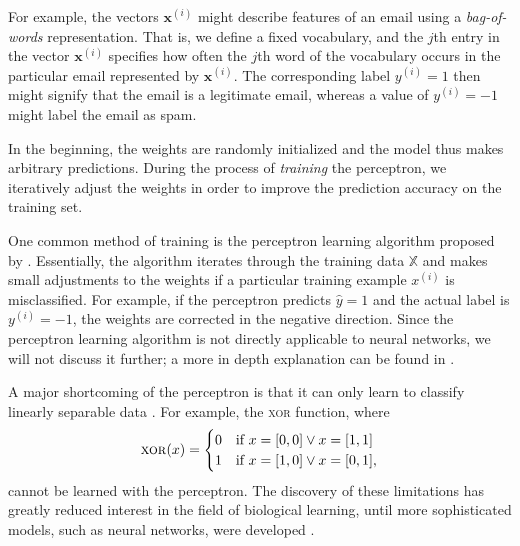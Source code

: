 For example, the vectors $\bm{x}^{(i)}$ might describe features of an email using a \emph{bag-of-words} representation. That is, we define a fixed vocabulary, and the $j$th entry in the vector $\bm{x}^{(i)}$ specifies how often the $j$th word of the vocabulary occurs in the particular email represented by $\bm{x}^{(i)}$. The corresponding label $y^{(i)} = 1$ then might signify that the email is a legitimate email, whereas a value of $y^{(i)} = -1$ might label the email as spam.

In the beginning, the weights are randomly initialized and the model thus makes arbitrary predictions. During the process of \emph{training} the perceptron, we iteratively adjust the weights in order to improve the prediction accuracy on the training set.

One common method of training is the perceptron learning algorithm proposed by \cite{Rosenblatt1958386}. Essentially, the algorithm iterates through the training data $\mathbb{X}$ and makes small adjustments to the weights if a particular training example $x^{(i)}$ is misclassified. For example, if the perceptron predicts $\hat{y} = 1$ and the actual label is $y^{(i)} = -1$, the weights are corrected in the negative direction. Since the perceptron learning algorithm is not directly applicable to neural networks, we will not discuss it further; a more in depth explanation can be found in \cite[Ch.\,8,\,pp.\,265-267]{DBLP:books/lib/Murphy12}.

A major shortcoming of the perceptron is that it can only learn to classify linearly separable data \cite{DBLP:books/daglib/0066902}. For example, the \textsc{xor} function, where 
\begin{equation}
\text{\textsc{xor}}(x) = 
\begin{cases} 0 & \text{if }x = [0,0] \lor x = [1,1] 
			\\1 & \text{if }x = [1,0] \lor x = [0,1],
\end{cases}
\end{equation}
cannot be learned with the perceptron. The discovery of these limitations has greatly reduced interest in the field of biological learning, until more sophisticated models, such as neural networks, were developed \cite[Ch.\,1,\,pp.\,12-18]{DBLP:books/daglib/0040158}.